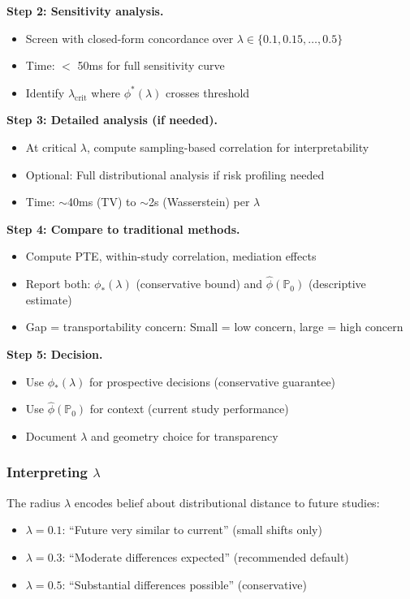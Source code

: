 \documentclass{article}
\newcommand{\PP}{\mathbb{P}}
\begin{document}
\textbf{Step 2: Sensitivity analysis.}
\begin{itemize}
    \item Screen with closed-form concordance over $\lambda \in \{0.1, 0.15, \ldots, 0.5\}$
    \item Time: $<$ 50ms for full sensitivity curve
    \item Identify $\lambda_{\text{crit}}$ where $\phi^*(\lambda)$ crosses threshold
\end{itemize}

\textbf{Step 3: Detailed analysis (if needed).}
\begin{itemize}
    \item At critical $\lambda$, compute sampling-based correlation for interpretability
    \item Optional: Full distributional analysis if risk profiling needed
    \item Time: $\sim$40ms (TV) to $\sim$2s (Wasserstein) per $\lambda$
\end{itemize}

\textbf{Step 4: Compare to traditional methods.}
\begin{itemize}
    \item Compute PTE, within-study correlation, mediation effects
    \item Report both: $\phi_*(\lambda)$ (conservative bound) and $\hat{\phi}(\PP_0)$ (descriptive estimate)
    \item Gap = transportability concern: Small = low concern, large = high concern
\end{itemize}

\textbf{Step 5: Decision.}
\begin{itemize}
    \item Use $\phi_*(\lambda)$ for prospective decisions (conservative guarantee)
    \item Use $\hat{\phi}(\PP_0)$ for context (current study performance)
    \item Document $\lambda$ and geometry choice for transparency
\end{itemize}

\subsubsection{Interpreting $\lambda$}

The radius $\lambda$ encodes belief about distributional distance to future studies:
\begin{itemize}
    \item $\lambda = 0.1$: ``Future very similar to current'' (small shifts only)
    \item $\lambda = 0.3$: ``Moderate differences expected'' (recommended default)
    \item $\lambda = 0.5$: ``Substantial differences possible'' (conservative)
\end{itemize}
\end{document}
